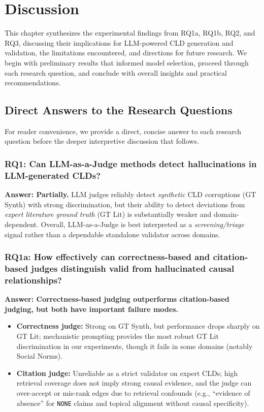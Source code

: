 \section{Discussion}
\label{sec:discussion}

This chapter synthesizes the experimental findings from RQ1a, RQ1b, RQ2, and RQ3, discussing their implications for LLM-powered CLD generation and validation, the limitations encountered, and directions for future research. We begin with preliminary results that informed model selection, proceed through each research question, and conclude with overall insights and practical recommendations.

\subsection{Direct Answers to the Research Questions}
\label{sec:discussion_rq_answers}
For reader convenience, we provide a direct, concise answer to each research question before the deeper interpretive discussion that follows.

\subsubsection*{RQ1: Can LLM-as-a-Judge methods detect hallucinations in LLM-generated CLDs?}
\textbf{Answer: Partially.} LLM judges reliably detect \textit{synthetic} CLD corruptions (GT Synth) with strong discrimination, but their ability to detect deviations from \textit{expert literature ground truth} (GT Lit) is substantially weaker and domain-dependent. Overall, LLM-as-a-Judge is best interpreted as a \textit{screening/triage} signal rather than a dependable standalone validator across domains.

\subsubsection*{RQ1a: How effectively can correctness-based and citation-based judges distinguish valid from hallucinated causal relationships?}
\textbf{Answer: Correctness-based judging outperforms citation-based judging, but both have important failure modes.}
\begin{itemize}[noitemsep]
    \item \textbf{Correctness judge:} Strong on GT Synth, but performance drops sharply on GT Lit; mechanistic prompting provides the most robust GT Lit discrimination in our experiments, though it fails in some domains (notably Social Norms).
    \item \textbf{Citation judge:} Unreliable as a strict validator on expert CLDs; high retrieval coverage does not imply strong causal evidence, and the judge can over-accept or mis-rank edges due to retrieval confounds (e.g., ``evidence of absence'' for \texttt{NONE} claims and topical alignment without causal specificity).
\end{itemize}


